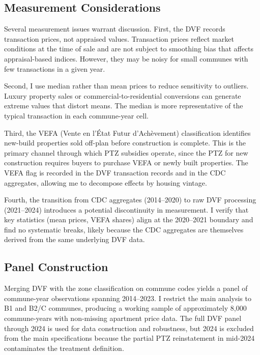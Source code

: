 \documentclass[12pt]{article}
\begin{document}
\subsection{Measurement Considerations}

Several measurement issues warrant discussion. First, the DVF records transaction prices, not appraised values. Transaction prices reflect market conditions at the time of sale and are not subject to smoothing bias that affects appraisal-based indices. However, they may be noisy for small communes with few transactions in a given year.

Second, I use median rather than mean prices to reduce sensitivity to outliers. Luxury property sales or commercial-to-residential conversions can generate extreme values that distort means. The median is more representative of the typical transaction in each commune-year cell.

Third, the VEFA (Vente en l'\'{E}tat Futur d'Ach\`{e}vement) classification identifies new-build properties sold off-plan before construction is complete. This is the primary channel through which PTZ subsidies operate, since the PTZ for new construction requires buyers to purchase VEFA or newly built properties. The VEFA flag is recorded in the DVF transaction records and in the CDC aggregates, allowing me to decompose effects by housing vintage.

Fourth, the transition from CDC aggregates (2014--2020) to raw DVF processing (2021--2024) introduces a potential discontinuity in measurement. I verify that key statistics (mean prices, VEFA shares) align at the 2020--2021 boundary and find no systematic breaks, likely because the CDC aggregates are themselves derived from the same underlying DVF data.

\subsection{Panel Construction}

Merging DVF with the zone classification on commune codes yields a panel of commune-year observations spanning 2014--2023. I restrict the main analysis to B1 and B2/C communes, producing a working sample of approximately 8,000 commune-years with non-missing apartment price data. The full DVF panel through 2024 is used for data construction and robustness, but 2024 is excluded from the main specifications because the partial PTZ reinstatement in mid-2024 contaminates the treatment definition.
\end{document}
